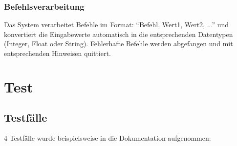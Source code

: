 \documentclass[a4paper,11pt]{article}
\begin{document}
\subsubsection{Befehlsverarbeitung}
Das System verarbeitet Befehle im Format: ``Befehl, Wert1, Wert2, ...'' und konvertiert die Eingabewerte automatisch in die entsprechenden Datentypen (Integer, Float oder String). Fehlerhafte Befehle werden abgefangen und mit entsprechenden Hinweisen quittiert.


\section{Test}
\subsection{Testfälle}
4 Testfälle wurde beispielsweise in die Dokumentation aufgenommen:\newline
\end{document}
